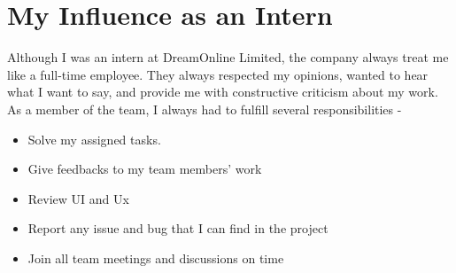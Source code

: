 \section{My Influence as an Intern}
\begin{flushleft}
    Although I was an intern at DreamOnline Limited, the company always treat me like a full-time
employee. They always respected my opinions, wanted to hear what I want to say, and provide
me with constructive criticism about my work. As a member of the team, I always had to fulfill
several responsibilities -

\begin{itemize}
    \item Solve my assigned tasks.
 \item Give feedbacks to my team members' work
 \item Review UI and Ux
 \item Report any issue and bug that I can find in the project
 \item Join all team meetings and discussions on time
\end{itemize}

\end{flushleft}

